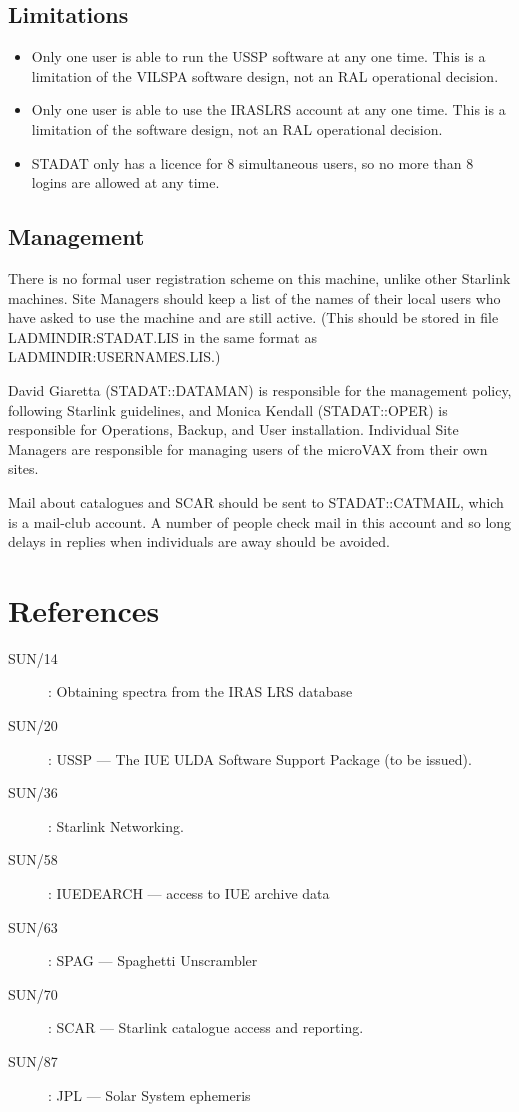\subsection{Limitations}

\begin{itemize}
\item Only one user is able to run the USSP software at any one time.
This is a limitation of the VILSPA software design, not an RAL operational
decision.
\item Only one user is able to use the IRASLRS account at any one time.
This is a limitation of the software design, not an RAL operational
decision.
\item STADAT only has a licence for 8 simultaneous users, so no more than 8
logins are allowed at any time.
\end {itemize}

\subsection{Management}

There is no formal user registration scheme on this machine, unlike other
Starlink machines.
Site Managers should keep a list of the names of their local users who have
asked to use the machine and are still active.
(This should be stored in file LADMINDIR:STADAT.LIS in the same format as
LADMINDIR:USERNAMES.LIS.)

David Giaretta (STADAT::DATAMAN) 
is responsible for the management policy, following Starlink
guidelines, and
Monica Kendall (STADAT::OPER) is responsible for Operations, 
Backup, and User installation.
Individual Site Managers are responsible for managing users of the microVAX
from their own sites.

Mail about catalogues and SCAR
should be sent to STADAT::CATMAIL, which is a mail-club account. A number 
of people  check mail in this account and so long delays in replies when
individuals are away should be avoided.

\section{References}

\begin{description}
\item [SUN/14] : Obtaining spectra from the IRAS LRS database
\item [SUN/20] : USSP --- The IUE ULDA Software Support Package (to be issued).
\item [SUN/36] : Starlink Networking.
\item [SUN/58] : IUEDEARCH --- access to IUE archive data
\item [SUN/63] : SPAG --- Spaghetti Unscrambler
\item [SUN/70] : SCAR --- Starlink catalogue access and reporting.
\item [SUN/87] : JPL --- Solar System ephemeris
\end{description}


